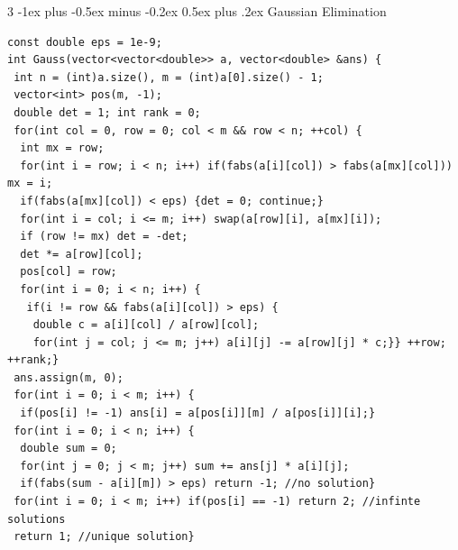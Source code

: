 \documentclass[8pt,a4paper,onesided]{article}
\makeatletter
\renewcommand{\subsection}{\@startsection{subsection}{2}{0mm}
    {-1ex plus -0.5ex minus -0.2ex} %
    {0.5ex plus .2ex}                %
    {\normalfont\large\bfseries}}    %
\makeatother
\begin{document}
\begin{multicols}{3}
\subsection{Gaussian Elimination}
\begin{verbatim}
const double eps = 1e-9;
int Gauss(vector<vector<double>> a, vector<double> &ans) {
 int n = (int)a.size(), m = (int)a[0].size() - 1;
 vector<int> pos(m, -1);
 double det = 1; int rank = 0;
 for(int col = 0, row = 0; col < m && row < n; ++col) {
  int mx = row;
  for(int i = row; i < n; i++) if(fabs(a[i][col]) > fabs(a[mx][col])) mx = i;
  if(fabs(a[mx][col]) < eps) {det = 0; continue;}
  for(int i = col; i <= m; i++) swap(a[row][i], a[mx][i]);
  if (row != mx) det = -det;
  det *= a[row][col];
  pos[col] = row;
  for(int i = 0; i < n; i++) {
   if(i != row && fabs(a[i][col]) > eps) {
    double c = a[i][col] / a[row][col];
    for(int j = col; j <= m; j++) a[i][j] -= a[row][j] * c;}} ++row; ++rank;}
 ans.assign(m, 0);
 for(int i = 0; i < m; i++) {
  if(pos[i] != -1) ans[i] = a[pos[i]][m] / a[pos[i]][i];}
 for(int i = 0; i < n; i++) {
  double sum = 0;
  for(int j = 0; j < m; j++) sum += ans[j] * a[i][j];
  if(fabs(sum - a[i][m]) > eps) return -1; //no solution}
 for(int i = 0; i < m; i++) if(pos[i] == -1) return 2; //infinte solutions
 return 1; //unique solution}
\end{verbatim}

\end{multicols}
\end{document}

